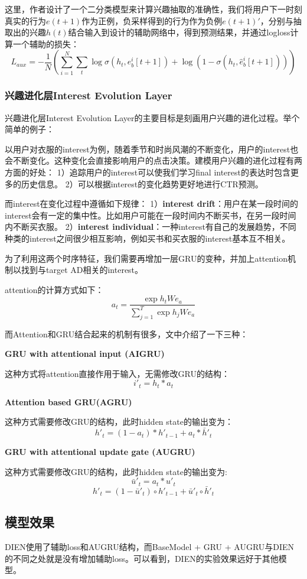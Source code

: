 \documentclass[12pt]{article}
\begin{document}
这里，作者设计了一个二分类模型来计算兴趣抽取的准确性，我们将用户下一时刻真实的行为$e(t+1)$作为正例，负采样得到的行为作为负例$e(t+1)'$，分别与抽取出的兴趣$h(t)$结合输入到设计的辅助网络中，得到预测结果，并通过logloss计算一个辅助的损失：
$$
L_{aux}  = -\frac{1}{N}(\sum_{i=1}^N\sum_t\log\sigma(h_t, e_b^i[t+1]) + \log(1-\sigma(h_t, \hat{e}_b^i[t+1])))
$$

\subsubsection{兴趣进化层Interest Evolution Layer}
兴趣进化层Interest Evolution Layer的主要目标是刻画用户兴趣的进化过程。举个简单的例子：

以用户对衣服的interest为例，随着季节和时尚风潮的不断变化，用户的interest也会不断变化。这种变化会直接影响用户的点击决策。建模用户兴趣的进化过程有两方面的好处：
1）追踪用户的interest可以使我们学习final interest的表达时包含更多的历史信息。
2）可以根据interest的变化趋势更好地进行CTR预测。

而interest在变化过程中遵循如下规律：
1）\textbf{interest drift}：用户在某一段时间的interest会有一定的集中性。比如用户可能在一段时间内不断买书，在另一段时间内不断买衣服。
2）\textbf{interest individual}：一种interest有自己的发展趋势，不同种类的interest之间很少相互影响，例如买书和买衣服的interest基本互不相关。

为了利用这两个时序特征，我们需要再增加一层GRU的变种，并加上attention机制以找到与target AD相关的interest。

attention的计算方式如下：
$$
a_t = \frac{\exp{h_tWe_a}}{\sum_{j=1}^T\exp{h_jWe_a}}
$$

而Attention和GRU结合起来的机制有很多，文中介绍了一下三种：

\textbf{GRU with attentional input (AIGRU)}

这种方式将attention直接作用于输入，无需修改GRU的结构：
$$
i'_t = h_t * a_t
$$

\textbf{Attention based GRU(AGRU)}

这种方式需要修改GRU的结构，此时hidden state的输出变为：
$$
h'_t = (1-a_t)*h'_{t-1} + a_t * \bar{h}'_t
$$

\textbf{GRU with attentional update gate (AUGRU)}

这种方式需要修改GRU的结构，此时hidden state的输出变为:
$$
\bar{u}'_t = a_t * u'_t
$$
$$
h'_t = (1-\bar{u}'_t) \circ h'_{t-1} + \bar{u}'_t \circ \bar{h}'_t
$$

\subsection{模型效果}
DIEN使用了辅助loss和AUGRU结构，而BaseModel + GRU + AUGRU与DIEN的不同之处就是没有增加辅助loss。可以看到，DIEN的实验效果远好于其他模型。
\end{document}

